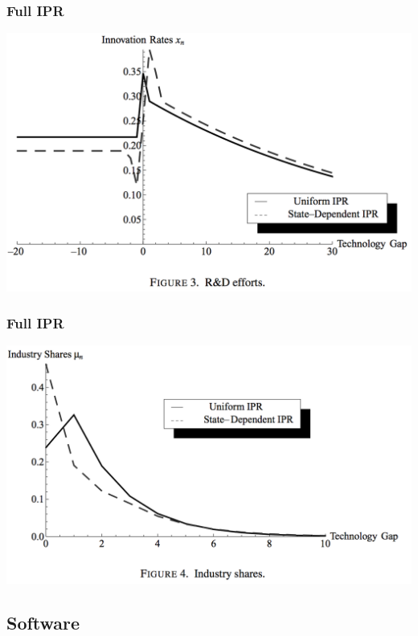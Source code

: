 \documentclass{beamer}
\begin{document}
\begin{frame}[t]\frametitle{Full IPR} 
  \begin{center}
    \includegraphics[scale=.28]{full_ipr_rnd.png}
    \label{fig:full_ipr_rnd}
  \end{center}
\end{frame}

\begin{frame}[t]\frametitle{Full IPR} 
  \begin{center}
    \includegraphics[scale=.28]{full_ipr_distbn.png}
    \label{fig:full_ipr_distbn}
  \end{center}
\end{frame}


\subsection{Software}
\label{sub:software}

\end{document}

